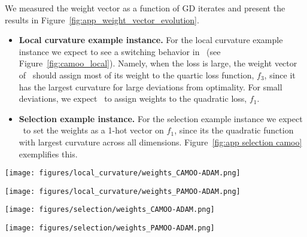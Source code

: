 We measured the weight vector as a function of GD iterates and present the results in Figure~\ref{fig:app_weight_vector_evolution}. 
\begin{itemize}
    \item \textbf{Local curvature example instance.} For the local curvature example instance we expect to see a switching behavior in \CAMOO\ (see Figure~\ref{fig:camoo_local}). Namely, when the loss is large, the weight vector of \CAMOO\ should assign most of its weight to the quartic loss function, $f_3$, since it has the largest curvature for large deviations from optimality. For small deviations, we expect \CAMOO\ to assign weights to the quadratic loss, $f_1$.

    \item \textbf{Selection example instance.} For the selection example instance we expect \CAMOO\ to set the weights as a 1-hot vector on $f_1$, since its the quadratic function with largest curvature across all dimensions. Figure~\ref{fig:app selection camoo} exemplifies this.

\end{itemize}


\begin{figure*}[t]
\vspace{-8pt}
    \centering
    \begin{minipage}{0.45\textwidth}
        \centering
        \texttt{[image: figures/local\_curvature/weights\_CAMOO-ADAM.png]}
        \caption{Local curvature example, \CAMOO. The weights flip when the curvature of the loss function changes.} \label{fig:camoo_local}
    \end{minipage}\hfill
    \centering
    \begin{minipage}{0.45\textwidth}
        \centering
        \texttt{[image: figures/local\_curvature/weights\_PAMOO-ADAM.png]} 
        \caption{Local curvature example, \PAMOO.}
    \end{minipage}\hfill

    \vspace{1cm}

        \begin{minipage}{0.45\textwidth}
        \centering
        \texttt{[image: figures/selection/weights\_CAMOO-ADAM.png]}
        \caption{Selection example, \CAMOO. } \label{fig:app selection camoo}
    \end{minipage}\hfill
    \centering
    \begin{minipage}{0.45\textwidth}
        \centering
        \texttt{[image: figures/selection/weights\_PAMOO-ADAM.png]} 
        \caption{Selection example, \PAMOO.}
    \end{minipage}\hfill
    
    \label{fig:app_weights_change}
    \caption{Weight vector evolution versus GD iterates.}\label{fig:app_weight_vector_evolution}
\end{figure*}
\newpage
